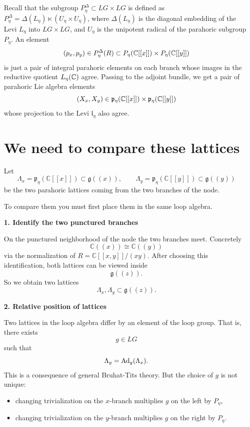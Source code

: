 \documentclass[12pt]{article}
\begin{document}
\section{}
Recall that the subgroup $P_\eta^\Delta \subset LG \times LG$ is defined as $P_\eta^\Delta = \Delta(L_\eta) \ltimes (U_\eta \times U_\eta)$, where $\Delta(L_\eta)$ is the diagonal embedding of the Levi $L_\eta$ into $LG \times LG$, and $U_\eta$ is the unipotent radical of the parahoric subgroup $P_\eta$.
An element
\[
(p_x,p_y)\in P_\eta^\Delta(R)
\subset P_\eta(\mathbb{C}[[x]])\times P_\eta(\mathbb{C}[[y]])
\]
is just a pair of integral parahoric elements on each branch whose images in the reductive quotient \(L_\eta(\mathbb{C})\) agree. Passing to the adjoint bundle, we get a pair of parahoric Lie algebra elements
\[  (X_x,X_y)\in \mathfrak p_\eta(\mathbb{C}[[x]])\times \mathfrak p_\eta(\mathbb{C}[[y]]) \]
whose projection to the Levi $\mathfrak l_\eta$ also agree. 


\section{We need to compare these lattices}
Let
\[
\Lambda_x=\mathfrak{p}_\eta(\mathbb{C}[[x]])\subset \mathfrak{g}((x)),\qquad
\Lambda_y=\mathfrak{p}_\eta(\mathbb{C}[[y]])\subset \mathfrak{g}((y))
\]
be the two parahoric lattices coming from the two branches of the node.

To compare them you must first place them in the same loop algebra.

\medskip\noindent\textbf{1. Identify the two punctured branches}

On the punctured neighborhood of the node the two branches meet. Concretely
\[
\mathbb{C}((x))\cong \mathbb{C}((y))
\]
via the normalization of $R=\mathbb{C}[[x,y]]/(xy)$. After choosing this identification, both lattices can be viewed inside
\[
\mathfrak{g}((z)).
\]
So we obtain two lattices
\[
\Lambda_x,\Lambda_y\subset \mathfrak{g}((z)).
\]

\medskip\noindent\textbf{2. Relative position of lattices}

Two lattices in the loop algebra differ by an element of the loop group. That is, there exists
\[
g\in LG
\]
such that
\[
\Lambda_y = \operatorname{Ad}_g(\Lambda_x).
\]
This is a consequence of general Bruhat-Tits theory.
But the choice of $g$ is not unique:
\begin{itemize}
    \item changing trivialization on the $x$-branch multiplies $g$ on the left by $P_\eta$,
    \item changing trivialization on the $y$-branch multiplies $g$ on the right by $P_\eta$.
\end{itemize}
\end{document}
